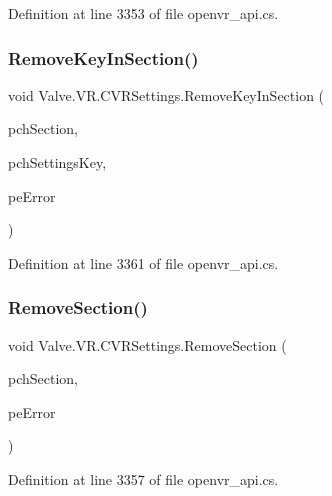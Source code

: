 Definition at line 3353 of file openvr\+\_\+api.\+cs.

\mbox{\label{class_valve_1_1_v_r_1_1_c_v_r_settings_ac304347cb817ba4d3418059cf7d99bb4}} 
\subsubsection{\texorpdfstring{RemoveKeyInSection()}{RemoveKeyInSection()}}
{\footnotesize\ttfamily void Valve.\+V\+R.\+C\+V\+R\+Settings.\+Remove\+Key\+In\+Section (\begin{DoxyParamCaption}\item[{string}]{pch\+Section,  }\item[{string}]{pch\+Settings\+Key,  }\item[{ref \mbox{\hyperlink{namespace_valve_1_1_v_r_aeab7722b211afc3885ed77faa931291f}{E\+V\+R\+Settings\+Error}}}]{pe\+Error }\end{DoxyParamCaption})}



Definition at line 3361 of file openvr\+\_\+api.\+cs.

\mbox{\label{class_valve_1_1_v_r_1_1_c_v_r_settings_a8095ef6c041dabd93703e782d038e7a5}} 
\subsubsection{\texorpdfstring{RemoveSection()}{RemoveSection()}}
{\footnotesize\ttfamily void Valve.\+V\+R.\+C\+V\+R\+Settings.\+Remove\+Section (\begin{DoxyParamCaption}\item[{string}]{pch\+Section,  }\item[{ref \mbox{\hyperlink{namespace_valve_1_1_v_r_aeab7722b211afc3885ed77faa931291f}{E\+V\+R\+Settings\+Error}}}]{pe\+Error }\end{DoxyParamCaption})}



Definition at line 3357 of file openvr\+\_\+api.\+cs.

\mbox{\label{class_valve_1_1_v_r_1_1_c_v_r_settings_af1b10a962dbdd60237bbe8eccd7cbbc2}} 
